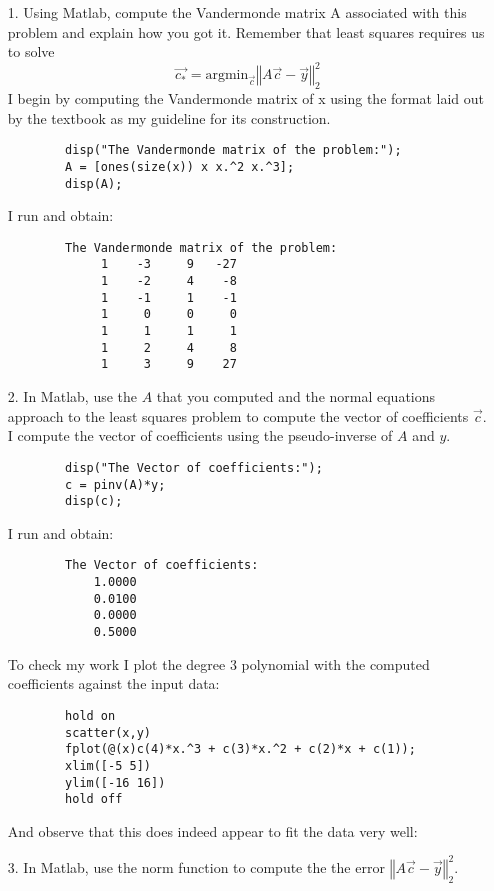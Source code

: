 \documentclass{article}
\begin{document}
\begin{itemize}
    \item[1.] Using Matlab, compute the Vandermonde matrix A associated with this problem and explain how you got it. Remember that least squares requires us to solve
    \[\overrightarrow{c_*} = \text{argmin}_{\overrightarrow{c}}\left\Vert A\overrightarrow{c}-\overrightarrow{y}\right\Vert^2_2\]
    \newline\newline
    I begin by computing the Vandermonde matrix of x using the format laid out by the textbook as my guideline for its construction. 
    \begin{verbatim}
        disp("The Vandermonde matrix of the problem:");
        A = [ones(size(x)) x x.^2 x.^3];
        disp(A);
    \end{verbatim}
    I run and obtain:
    \begin{verbatim}
        The Vandermonde matrix of the problem:
             1    -3     9   -27
             1    -2     4    -8
             1    -1     1    -1
             1     0     0     0
             1     1     1     1
             1     2     4     8
             1     3     9    27
    \end{verbatim}
    
    \newpage
    \item[2.] In Matlab, use the $A$ that you computed and the normal equations approach to the least squares problem to compute the vector of coefficients $\overrightarrow{c}$.
    \newline\newline
    I compute the vector of coefficients using the pseudo-inverse of $A$ and $y$.
    \begin{verbatim}
        disp("The Vector of coefficients:");
        c = pinv(A)*y;
        disp(c);
    \end{verbatim}
     I run and obtain:
    \begin{verbatim}
        The Vector of coefficients:
            1.0000
            0.0100
            0.0000
            0.5000
    \end{verbatim}
    To check my work I plot the degree 3 polynomial with the computed coefficients against the input data:
    \begin{verbatim}
        hold on
        scatter(x,y)
        fplot(@(x)c(4)*x.^3 + c(3)*x.^2 + c(2)*x + c(1));
        xlim([-5 5])
        ylim([-16 16])
        hold off
    \end{verbatim}
    And observe that this does indeed appear to fit the data very well:
    
    
    \item[3.] In Matlab, use the norm function to compute the the error $\left\Vert A\overrightarrow{c}-\overrightarrow{y}\right\Vert^2_2$.
\end{itemize}
\end{document}
